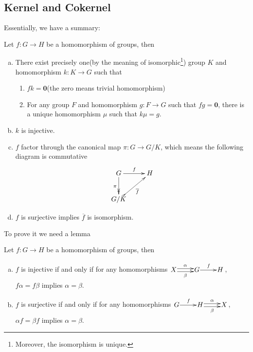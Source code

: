 \subsection{Kernel and Cokernel}
  Essentially, we have a summary:
\begin{thm}\label{1}
  Let $f\colon G\to H$ be a homomorphism of groups, then
  \begin{enumerate}[a)]
    \setlength{\itemindent}{2ex}
    \item There exist precisely one(by the meaning of isomorphic\footnote{Moreover, the isomorphism is unique.}) group $K$ and homomorphism $k\colon K\to G$ such that
      \begin{enumerate}[1)]
       \setlength{\itemindent}{2ex}
       \item $fk=\mathbf{0}$(the zero means trivial homomorphism)
       \item For any group $F$ and homomorphism $g\colon F\to G$ such that $fg=\mathbf{0}$, there is a unique homomorphism $\mu$ such that $k\mu=g$.
      \end{enumerate}
    \item $k$ is injective.
    \item $f$ factor through the canonical map $\pi\colon G\to G/K$, which means the following diagram is commutative
\begin{displaymath}
   \xymatrix{
   G\ar[r]^{f}\ar@{->>}[d]_{\pi}&H\\
   G/K\ar@{>->}[ur]_{\overline{f}}&
   }
\end{displaymath}
    \item $f$ is surjective implies $\overline{f}$ is isomorphism.
  \end{enumerate}
\end{thm}
To prove it we need a lemma
\begin{lem}\label{2}
  Let $f\colon G\to H$ be a homomorphism of groups, then
  \begin{enumerate}[a)]
    \setlength{\itemindent}{2ex}
    \item $f$ is injective if and only if for any homomorphisms $\xymatrix@1{X\ar@<0.5ex>[r]^{\alpha}\ar@<-0.5ex>[r]_{\beta} &G\ar[r]^{f} &H}$, $f\alpha=f\beta$ implies $\alpha=\beta$.
    \item $f$ is surjective if and only if for any homomorphisms $\xymatrix@1{G\ar[r]^{f} &H\ar@<0.5ex>[r]^{\alpha}\ar@<-0.5ex>[r]_{\beta} &X}$, $\alpha f=\beta f$ implies $\alpha=\beta$.
  \end{enumerate}
\end{lem}
